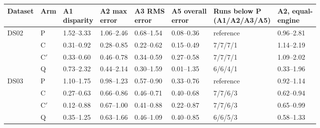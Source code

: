 \begin{tabular}{llllllll}
\toprule
Dataset & Arm & \makecell{A1\\disparity} & \makecell{A2 max\\error} & \makecell{A3 RMS\\error} & \makecell{A5 overall\\error} & \makecell{Runs below P\\(A1/A2/A3/A5)} & \makecell{A2, equal-\\engine} \\
\midrule
DS02 & P & 1.52--3.33 & 1.06--2.46 & 0.68--1.54 & 0.08--0.36 & reference & 0.96--2.81 \\
 & C & 0.31--0.92 & 0.28--0.85 & 0.22--0.62 & 0.15--0.49 & 7/7/7/1 & 1.14--2.19 \\
 & C$'$ & 0.33--0.60 & 0.46--0.78 & 0.34--0.59 & 0.27--0.58 & 7/7/7/1 & 1.09--2.02 \\
 & Q & 0.73--2.32 & 0.44--2.14 & 0.30--1.59 & 0.01--1.35 & 6/6/4/1 & 0.33--1.96 \\
\midrule
DS03 & P & 1.10--1.75 & 0.98--1.23 & 0.57--0.90 & 0.33--0.76 & reference & 0.92--1.14 \\
 & C & 0.27--0.63 & 0.66--0.86 & 0.46--0.71 & 0.40--0.68 & 7/7/6/3 & 0.62--0.94 \\
 & C$'$ & 0.12--0.88 & 0.67--1.00 & 0.41--0.88 & 0.22--0.87 & 7/7/6/3 & 0.65--0.99 \\
 & Q & 0.35--1.25 & 0.63--1.66 & 0.46--1.09 & 0.40--0.85 & 6/6/5/3 & 0.58--1.33 \\
\bottomrule
\end{tabular}
